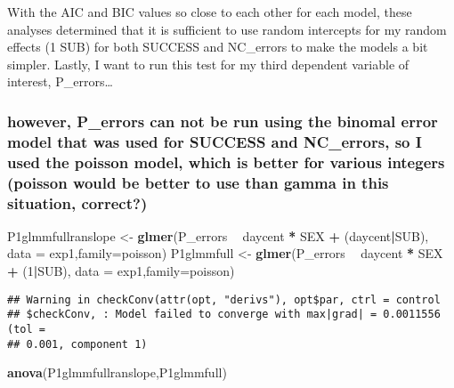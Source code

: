 \documentclass[]{article}
\newenvironment{Shaded}{\begin{snugshade}}{\end{snugshade}}
\newcommand{\KeywordTok}[1]{\textcolor[rgb]{0.13,0.29,0.53}{\textbf{#1}}}
\newcommand{\DataTypeTok}[1]{\textcolor[rgb]{0.13,0.29,0.53}{#1}}
\newcommand{\DecValTok}[1]{\textcolor[rgb]{0.00,0.00,0.81}{#1}}
\newcommand{\StringTok}[1]{\textcolor[rgb]{0.31,0.60,0.02}{#1}}
\newcommand{\OperatorTok}[1]{\textcolor[rgb]{0.81,0.36,0.00}{\textbf{#1}}}
\newcommand{\NormalTok}[1]{#1}
\begin{document}
With the AIC and BIC values so close to each other for each model, these
analyses determined that it is sufficient to use random intercepts for
my random effects (1 \textbar{} SUB) for both SUCCESS and NC\_errors to
make the models a bit simpler. Lastly, I want to run this test for my
third dependent variable of interest, P\_errors\ldots{}

\subsubsection{however, P\_errors can not be run using the binomal error
model that was used for SUCCESS and NC\_errors, so I used the poisson
model, which is better for various integers (poisson would be better to
use than gamma in this situation,
correct?)}\label{however-p_errors-can-not-be-run-using-the-binomal-error-model-that-was-used-for-success-and-nc_errors-so-i-used-the-poisson-model-which-is-better-for-various-integers-poisson-would-be-better-to-use-than-gamma-in-this-situation-correct}

\begin{Shaded}
\begin{Highlighting}[]
\NormalTok{P1glmmfullranslope <-}\StringTok{ }\KeywordTok{glmer}\NormalTok{(P_errors }\OperatorTok{~}\StringTok{ }\NormalTok{daycent }\OperatorTok{*}\StringTok{ }\NormalTok{SEX }\OperatorTok{+}\StringTok{ }\NormalTok{(daycent}\OperatorTok{|}\NormalTok{SUB), }\DataTypeTok{data =}\NormalTok{ exp1,}\DataTypeTok{family=}\NormalTok{poisson)}
\NormalTok{P1glmmfull <-}\StringTok{ }\KeywordTok{glmer}\NormalTok{(P_errors }\OperatorTok{~}\StringTok{ }\NormalTok{daycent }\OperatorTok{*}\StringTok{ }\NormalTok{SEX }\OperatorTok{+}\StringTok{ }\NormalTok{(}\DecValTok{1}\OperatorTok{|}\NormalTok{SUB), }\DataTypeTok{data =}\NormalTok{ exp1,}\DataTypeTok{family=}\NormalTok{poisson)}
\end{Highlighting}
\end{Shaded}

\begin{verbatim}
## Warning in checkConv(attr(opt, "derivs"), opt$par, ctrl = control
## $checkConv, : Model failed to converge with max|grad| = 0.0011556 (tol =
## 0.001, component 1)
\end{verbatim}

\begin{Shaded}
\begin{Highlighting}[]
\KeywordTok{anova}\NormalTok{(P1glmmfullranslope,P1glmmfull)}
\end{Highlighting}
\end{Shaded}
\end{document}
